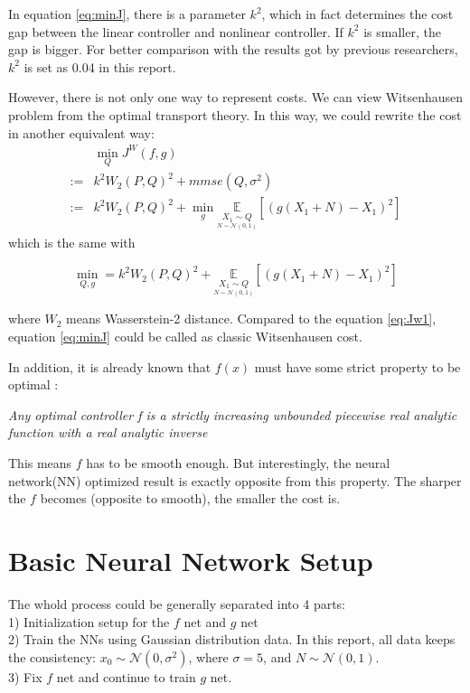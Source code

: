 \documentclass[conference,compsoc]{IEEEtran}
\begin{document}
In equation \eqref{eq:minJ}, there is a parameter $k^2$, which in fact determines the cost gap between the linear controller and nonlinear controller\cite{baglietto2001numerical}. If $k^2$ is smaller, the gap is bigger. For better comparison with the results got by previous researchers, $k^2$ is set as 0.04 in this report.

However, there is not only one way to represent costs.\cite{wu2011witsenhausen} We can view Witsenhausen problem from the optimal transport theory. In this way, we could rewrite the cost in another equivalent way:
{
\begin{equation}\label{eq:Jw1}
  \begin{aligned}
&\min_{Q}J^{W}(f,g)\\
:=&k^{2}W_2(P,Q)^{2}+mmse(Q,\sigma^2)\\
:=&k^{2}W_2(P,Q)^{2}+\min_{g}\underset{ \underset{N \sim \mathcal{N}(0,1)}{X_1\sim Q} }{\mathbb{E}}[(g(X_1+N)-X_1)^2]
  \end{aligned}
\end{equation}
}
which is the same with

\begin{equation}\label{eq:Jw2}
\min_{Q,g}=k^{2}W_2(P,Q)^{2}+\underset{ \underset{N \sim \mathcal{N}(0,1)}{X_1\sim Q} }{\mathbb{E}}[(g(X_1+N)-X_1)^2]
\end{equation}

where $W_2$ means Wasserstein-2 distance. Compared to the equation \eqref{eq:Jw1}, equation \eqref{eq:minJ} could be called as classic Witsenhausen cost.

In addition, it is already known that $f(x)$ must have some strict property to be optimal \cite{wu2011witsenhausen} :
\begin{adjustwidth}{0.5cm}{}
\textbullet \quad \textit{Any optimal controller f is a strictly increasing unbounded piecewise real analytic function with a real analytic inverse}
\end{adjustwidth}

This means $f$ has to be smooth enough. But interestingly, the neural network(NN) optimized result is exactly opposite from this property. The sharper the $f$ becomes (opposite to smooth), the smaller the cost is.

\section{Basic Neural Network Setup}
The whold process could be generally separated into 4 parts:\\
1) Initialization setup for the $f$ net and $g$ net\\
2) Train the NNs using Gaussian distribution data. In this report, all data keeps the consistency: $x_0\sim \mathcal{N} (0,\sigma^2)$, where $\sigma=5$, and $N\sim \mathcal{N} (0,1)$. \\
3) Fix $f$ net and continue to train $g$ net.
\end{document}
